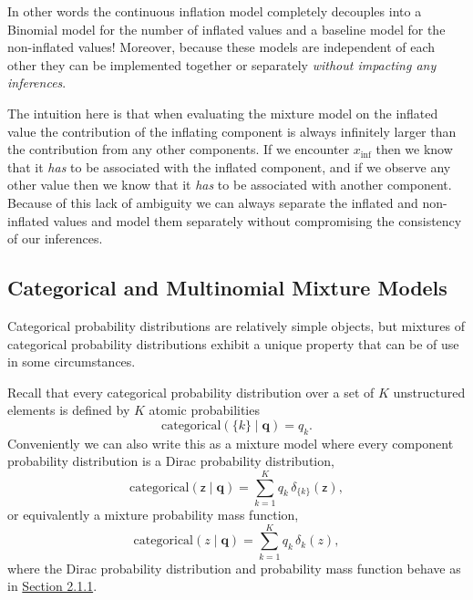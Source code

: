 \documentclass[
  letterpaper,
  DIV=11,
  numbers=noendperiod]{scrartcl}
\begin{document}
In other words the continuous inflation model completely decouples into
a Binomial model for the number of inflated values and a baseline model
for the non-inflated values! Moreover, because these models are
independent of each other they can be implemented together or separately
\emph{without impacting any inferences}.

The intuition here is that when evaluating the mixture model on the
inflated value the contribution of the inflating component is always
infinitely larger than the contribution from any other components. If we
encounter \(x_{\mathrm{inf}}\) then we know that it \emph{has} to be
associated with the inflated component, and if we observe any other
value then we know that it \emph{has} to be associated with another
component. Because of this lack of ambiguity we can always separate the
inflated and non-inflated values and model them separately without
compromising the consistency of our inferences.

\subsection{Categorical and Multinomial Mixture
Models}\label{categorical-and-multinomial-mixture-models}

Categorical probability distributions are relatively simple objects, but
mixtures of categorical probability distributions exhibit a unique
property that can be of use in some circumstances.

Recall that every categorical probability distribution over a set of
\(K\) unstructured elements is defined by \(K\) atomic probabilities \[
\mathrm{categorical}( \{ k \} \mid \mathbf{q})
= q_{k}.
\] Conveniently we can also write this as a mixture model where every
component probability distribution is a Dirac probability distribution,
\[
\mathrm{categorical}( \mathsf{z} \mid \mathbf{q} )
=
\sum_{k = 1}^{K} q_{k} \, \delta_{ \{ k \} }( \mathsf{z} ),
\] or equivalently a mixture probability mass function, \[
\mathrm{categorical}( z \mid \mathbf{q})
=
\sum_{k = 1}^{K} q_{k} \, \delta_{ k }( z ),
\] where the Dirac probability distribution and probability mass
function behave as in \hyperref[sec:inflation]{Section 2.1.1}.
\end{document}
